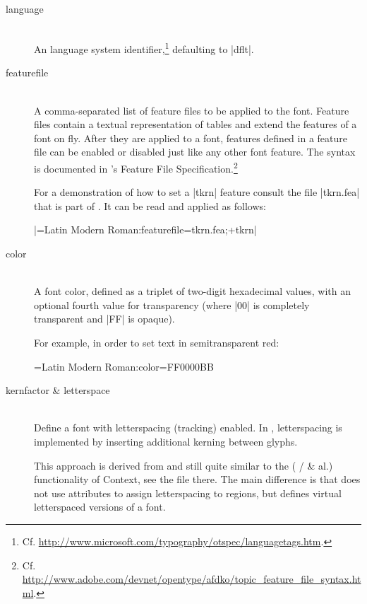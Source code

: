 \begin{description}
\item [language] \hfill \\
       An \OpenType language system identifier,\footnote{%
         Cf. \url{http://www.microsoft.com/typography/otspec/languagetags.htm}.
       }
       defaulting to |dflt|.

\item [featurefile] \hfill \\
       A comma-separated list of feature files to be applied to the
       font.
       Feature files contain a textual representation of
       \OpenType tables and extend the features of a font
       on fly.
       After they are applied to a font, features defined in a
       feature file can be enabled or disabled just like any
       other font feature.
       The syntax is documented in ’s
       \OpenType Feature File Specification.\footnote{%
         Cf. \url{http://www.adobe.com/devnet/opentype/afdko/topic_feature_file_syntax.html}.
       }

       For a demonstration of how to set a |tkrn| feature consult
       the file |tkrn.fea| that is part of .
       It can be read and applied as follows:

       |\font\test=Latin Modern Roman:featurefile=tkrn.fea;+tkrn|

\item [color] \hfill \\
       A font color, defined as a triplet of two-digit hexadecimal
        values, with an optional fourth value for
       transparency
       (where |00| is completely transparent and |FF| is opaque).

       For example, in order to set text in semitransparent red:

			 \beginlisting
 \font\test={Latin Modern Roman}:color=FF0000BB
			 \endlisting

\item [kernfactor \& letterspace] \hfill \\
       Define a font with letterspacing (tracking) enabled.
       In , letterspacing is implemented by
       inserting additional kerning between glyphs.

       This approach is derived from and still quite similar to the
        ( /
        \& al.) functionality of
       Context, see the file  there.
       The main difference is that  does not
       use \LUATEX attributes to assign letterspacing to regions,
       but defines virtual letterspaced versions of a font.


\end{description}
